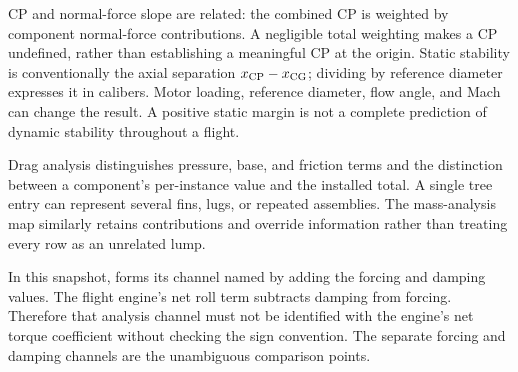CP and normal-force slope are related: the combined CP is weighted by component normal-force contributions. A negligible total weighting makes a CP undefined, rather than establishing a meaningful CP at the origin. Static stability is conventionally the axial separation $x_{\rm CP}-x_{\rm CG}$; dividing by reference diameter expresses it in calibers. Motor loading, reference diameter, flow angle, and Mach can change the result. A positive static margin is not a complete prediction of dynamic stability throughout a flight.

Drag analysis distinguishes pressure, base, and friction terms and the distinction between a component's per-instance value and the installed total. A single tree entry can represent several fins, lugs, or repeated assemblies. The mass-analysis map similarly retains contributions and override information rather than treating every row as an unrelated lump.

\begin{contract}
In this snapshot,  forms its channel named  by adding the forcing and damping values. The flight engine's net roll term subtracts damping from forcing. Therefore that analysis channel must not be identified with the engine's net torque coefficient without checking the sign convention. The separate forcing and damping channels are the unambiguous comparison points.
\end{contract}

